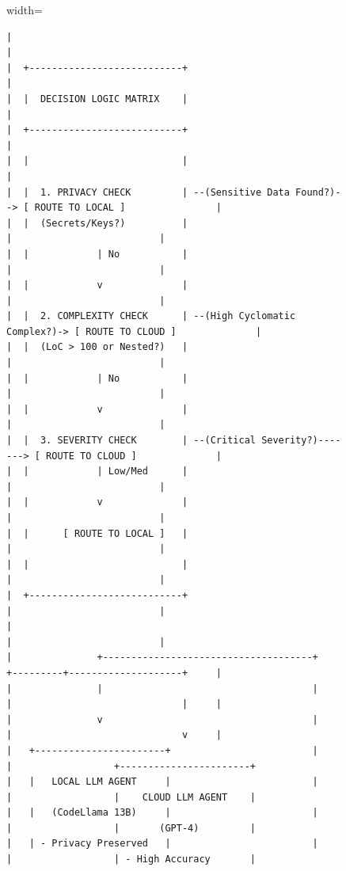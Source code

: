 \documentclass[conference]{IEEEtran}
\begin{document}
\begin{figure}[t]
\begin{adjustbox}{width=\textwidth}
\begin{small}
\begin{verbatim}
|                                                                                               |
|  +---------------------------+                                                                |
|  |  DECISION LOGIC MATRIX    |                                                                |
|  +---------------------------+                                                                |
|  |                           |                                                                |
|  |  1. PRIVACY CHECK         | --(Sensitive Data Found?)--> [ ROUTE TO LOCAL ]                |
|  |  (Secrets/Keys?)          |                                     |                          |
|  |            | No           |                                     |                          |
|  |            v              |                                     |                          |
|  |  2. COMPLEXITY CHECK      | --(High Cyclomatic Complex?)-> [ ROUTE TO CLOUD ]              |
|  |  (LoC > 100 or Nested?)   |                                     |                          |
|  |            | No           |                                     |                          |
|  |            v              |                                     |                          |
|  |  3. SEVERITY CHECK        | --(Critical Severity?)-------> [ ROUTE TO CLOUD ]              |
|  |            | Low/Med      |                                     |                          |
|  |            v              |                                     |                          |
|  |      [ ROUTE TO LOCAL ]   |                                     |                          |
|  |                           |                                     |                          |
|  +---------------------------+                                     |                          |
|                                                                    |                          |
|               +-------------------------------------+    +---------+--------------------+     |
|               |                                     |    |                              |     |
|               v                                     |    |                              v     |
|   +-----------------------+                         |    |                  +-----------------------+
|   |   LOCAL LLM AGENT     |                         |    |                  |    CLOUD LLM AGENT    |
|   |   (CodeLlama 13B)     |                         |    |                  |       (GPT-4)         |
|   | - Privacy Preserved   |                         |    |                  | - High Accuracy       |

\end{verbatim}
\end{small}
\end{adjustbox}
\end{figure}
\end{document}
